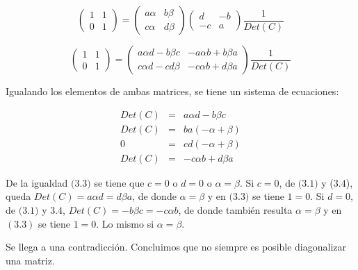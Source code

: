 \bigskip

$$\left(\begin{array}{cc}  1 & 1  \\ 0 &  1
\end{array}
 \right)= \left(\begin{array}{cc}  a\alpha & b\beta  \\ c\alpha &  d\beta
\end{array}
 \right)  \left(\begin{array}{cc}  d & -b  \\ -c &  a
\end{array}
 \right) \frac{1} {Det(C)}$$
 
\bigskip 


$$\left(\begin{array}{cc}  1 & 1  \\ 0 &  1
\end{array}
 \right)= \left(\begin{array}{cc}  a\alpha d - b\beta c & -a\alpha b + b  \beta a \\ c \alpha d - c d \beta &  -c \alpha b +  d \beta a
\end{array}
 \right)   \frac{1} {Det(C)}$$

\bigskip

Igualando los elementos de ambas matrices, se tiene un sistema de ecuaciones:

\bigskip
\begin{eqnarray}
Det(C)&=& a\alpha d - b\beta c \\
Det(C)&=& ba( -\alpha  +   \beta )  \\
0&=&cd( -\alpha  +   \beta )  \\
Det(C)&=& -c \alpha b + d \beta a
\end{eqnarray}
 


\bigskip

\bigskip

De la igualdad $(3$.$3)$  se tiene que $c=0$ o $d=0$ o $\alpha = \beta$. Si $c=0$, de $(3$.$1)$ y ($3$.$4$), queda $Det(C)= a\alpha d= d \beta a$, de donde $\alpha = \beta$ y en $(3$.$3)$ se tiene $1=0$.
Si $d=0$, de $(3$.$1)$ y $3$.$4$,  $Det(C)= - b \beta c = -c\alpha b $, de donde también resulta $\alpha = \beta$ y en $(3.3)$ se tiene $1=0$. Lo mismo si $\alpha = \beta$. 

Se llega a una contradicción. Concluimos que no siempre es posible diagonalizar una matriz.

\bigskip

